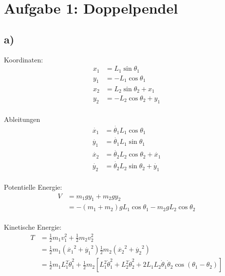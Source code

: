 \documentclass{scrartcl}
\begin{document}
\section*{Aufgabe 1: Doppelpendel}
\subsection*{a)}

Koordinaten:
\begin{align*}
	x_1 &= L_1  \sin{\theta_1} \\
	y_1 &= -L_1  \cos{\theta_1} \\
	x_2 &= L_2  \sin{\theta_2} + x_1 \\
	y_2 &= -L_2  \cos{\theta_2} + y_1 \\
\end{align*}

Ableitungen
\begin{align*}
	\dot{x_1} &= \dot{\theta_1} L_1  \cos{\theta_1} \\
	\dot{y_1} &= \dot{\theta_1 }L_1  \sin{\theta_1} \\
	\dot{x_2} &= \dot{\theta_2 }L_2  \cos{\theta_2} + \dot{x_1} \\
	\dot{y_2} &= \dot{\theta_2} L_2  \sin{\theta_2} + \dot{y_1} \\
\end{align*}


Potentielle Energie:
\begin{align*}
	V &= m_1 g y_1 + m_2 g y_2 \\
	 &= -\left( m_1 + m_2 \right) g  L_1  \cos{\theta_1}-m_2  g  L_2  \cos{\theta_2} \\
\end{align*}


Kinetische Energie:
\begin{align*}
	T &= \frac 1 2 m_1 v_1^2 + \frac 1 2 m_2 v_2^2 \\
	&= \frac 1 2 m_1 \left(\dot{x_1}^2 + \dot{y_1}^2 \right) \frac 1 2 m_2 \left(\dot{x_2}^2 + \dot{y_2}^2 \right) \\
	&= \frac { 1 } { 2 } m _ { 1 } L _ { 1 } ^ { 2 } \dot { \theta } _ { 1 } ^ { 2 } + \frac { 1 } { 2 } m _ { 2 } \left[ L _ { 1 } ^ { 2 } \dot { \theta } _ { 1 } ^ { 2 } + L _ { 2 } ^ { 2 } \dot { \theta } _ { 2 } ^ { 2 } + 2 L _ { 1 } L _ { 2 } \dot { \theta } _ { 1 } \dot { \theta } _ { 2 } \cos \left( \theta _ { 1 } - \theta _ { 2 } \right) \right]  \\
\end{align*}
\end{document}
